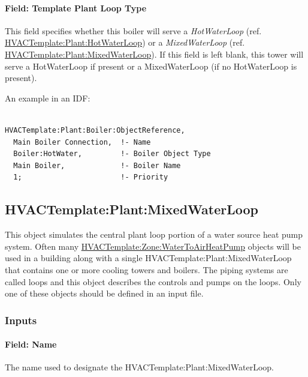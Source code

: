 \paragraph{Field: Template Plant Loop Type}\label{field-template-plant-loop-type-3}

This field specifies whether this boiler will serve a \emph{HotWaterLoop} (ref. \hyperref[hvactemplateplanthotwaterloop]{HVACTemplate:Plant:HotWaterLoop}) or a \emph{MixedWaterLoop} (ref. \hyperref[hvactemplateplantmixedwaterloop]{HVACTemplate:Plant:MixedWaterLoop}). If this field is left blank, this tower will serve a HotWaterLoop if present or a MixedWaterLoop (if no HotWaterLoop is present).

An example in an IDF:

\begin{lstlisting}

HVACTemplate:Plant:Boiler:ObjectReference,
  Main Boiler Connection,  !- Name
  Boiler:HotWater,         !- Boiler Object Type
  Main Boiler,             !- Boiler Name
  1;                       !- Priority
\end{lstlisting}

\subsection{HVACTemplate:Plant:MixedWaterLoop}\label{hvactemplateplantmixedwaterloop}

This object simulates the central plant loop portion of a water source heat pump system. Often many \hyperref[hvactemplatezonewatertoairheatpump]{HVACTemplate:Zone:WaterToAirHeatPump} objects will be used in a building along with a single HVACTemplate:Plant:MixedWaterLoop that contains one or more cooling towers and boilers. The piping systems are called loops and this object describes the controls and pumps on the loops. Only one of these objects should be defined in an input file.

\subsubsection{Inputs}\label{inputs-31-000}

\paragraph{Field: Name}\label{field-name-18-002}

The name used to designate the HVACTemplate:Plant:MixedWaterLoop.

